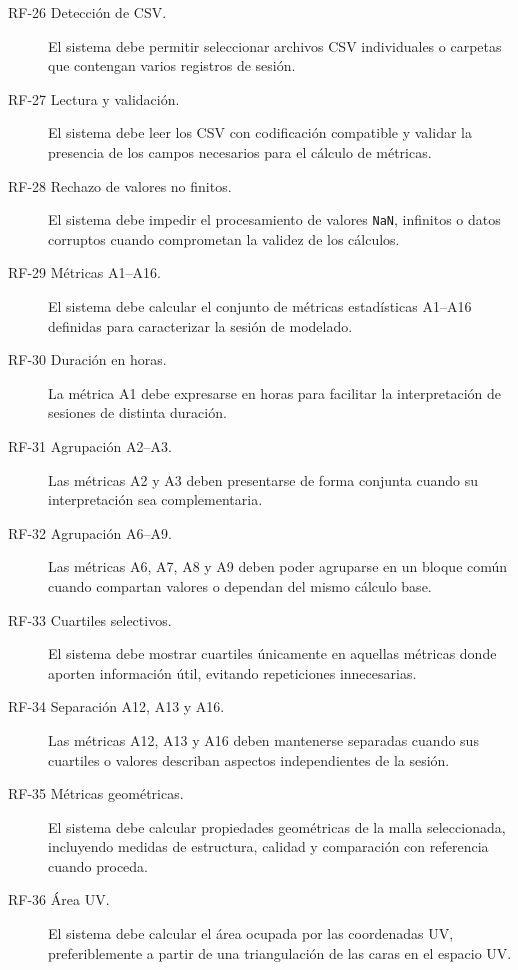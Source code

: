 \begin{description}
    \item[RF-26 Detección de CSV.] El sistema debe permitir seleccionar archivos CSV individuales o carpetas que contengan varios registros de sesión.

    \item[RF-27 Lectura y validación.] El sistema debe leer los CSV con codificación compatible y validar la presencia de los campos necesarios para el cálculo de métricas.

    \item[RF-28 Rechazo de valores no finitos.] El sistema debe impedir el procesamiento de valores \texttt{NaN}, infinitos o datos corruptos cuando comprometan la validez de los cálculos.

    \item[RF-29 Métricas A1--A16.] El sistema debe calcular el conjunto de métricas estadísticas A1--A16 definidas para caracterizar la sesión de modelado.

    \item[RF-30 Duración en horas.] La métrica A1 debe expresarse en horas para facilitar la interpretación de sesiones de distinta duración.

    \item[RF-31 Agrupación A2--A3.] Las métricas A2 y A3 deben presentarse de forma conjunta cuando su interpretación sea complementaria.

    \item[RF-32 Agrupación A6--A9.] Las métricas A6, A7, A8 y A9 deben poder agruparse en un bloque común cuando compartan valores o dependan del mismo cálculo base.

    \item[RF-33 Cuartiles selectivos.] El sistema debe mostrar cuartiles únicamente en aquellas métricas donde aporten información útil, evitando repeticiones innecesarias.

    \item[RF-34 Separación A12, A13 y A16.] Las métricas A12, A13 y A16 deben mantenerse separadas cuando sus cuartiles o valores describan aspectos independientes de la sesión.

    \item[RF-35 Métricas geométricas.] El sistema debe calcular propiedades geométricas de la malla seleccionada, incluyendo medidas de estructura, calidad y comparación con referencia cuando proceda.

    \item[RF-36 Área UV.] El sistema debe calcular el área ocupada por las coordenadas UV, preferiblemente a partir de una triangulación de las caras en el espacio UV.


\end{description}
